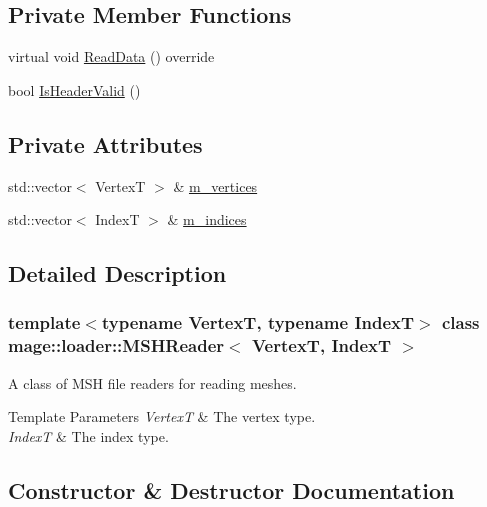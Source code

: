 \subsection*{Private Member Functions}
\begin{DoxyCompactItemize}
\item 
virtual void \hyperlink{classmage_1_1loader_1_1_m_s_h_reader_aac059b991d1151473af2422be688552e}{Read\+Data} () override
\item 
bool \hyperlink{classmage_1_1loader_1_1_m_s_h_reader_aa57b3fe6bc5bfc6ae92ad761e210bbcf}{Is\+Header\+Valid} ()
\end{DoxyCompactItemize}
\subsection*{Private Attributes}
\begin{DoxyCompactItemize}
\item 
std\+::vector$<$ VertexT $>$ \& \hyperlink{classmage_1_1loader_1_1_m_s_h_reader_ab4413e78d8e4dab29bf144aed59e33fd}{m\+\_\+vertices}
\item 
std\+::vector$<$ IndexT $>$ \& \hyperlink{classmage_1_1loader_1_1_m_s_h_reader_a10ff2ab6abb709fbc044a9fa7f49624e}{m\+\_\+indices}
\end{DoxyCompactItemize}


\subsection{Detailed Description}
\subsubsection*{template$<$typename VertexT, typename IndexT$>$\newline
class mage\+::loader\+::\+M\+S\+H\+Reader$<$ Vertex\+T, Index\+T $>$}

A class of M\+SH file readers for reading meshes.


\begin{DoxyTemplParams}{Template Parameters}
{\em VertexT} & The vertex type. \\
\hline
{\em IndexT} & The index type. \\
\hline
\end{DoxyTemplParams}


\subsection{Constructor \& Destructor Documentation}
\hypertarget{classmage_1_1loader_1_1_m_s_h_reader_aba90bcecc8c6c515cb5de1aaf90b1afe}{}\label{classmage_1_1loader_1_1_m_s_h_reader_aba90bcecc8c6c515cb5de1aaf90b1afe} 

